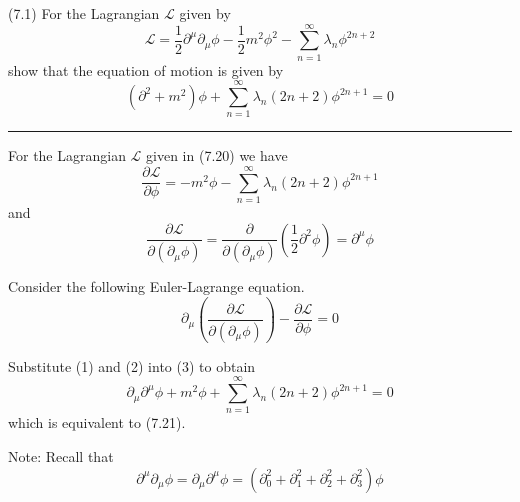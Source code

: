 \documentclass[12pt]{article}
\begin{document}
(7.1)
For the Lagrangian $\mathcal L$ given by
\begin{equation*}
\mathcal L=\frac{1}{2}\partial^\mu\partial_\mu\phi
-\frac{1}{2}m^2\phi^2-\sum_{n=1}^\infty\lambda_n\phi^{2n+2}
\tag{7.20}
\end{equation*}
show that the equation of motion is given by
\begin{equation*}
(\partial^2+m^2)\phi
+\sum_{n=1}^\infty\lambda_n(2n+2)\phi^{2n+1}=0
\tag{7.21}
\end{equation*}

\bigskip
\hrule

\bigskip
For the Lagrangian $\mathcal L$ given in (7.20) we have
\begin{equation*}
\frac{\partial\mathcal L}{\partial\phi}=-m^2\phi-\sum_{n=1}^\infty\lambda_n(2n+2)\phi^{2n+1}
\tag{1}
\end{equation*}
and
\begin{equation*}
\frac{\partial\mathcal L}{\partial(\partial_\mu\phi)}
=\frac{\partial}{\partial(\partial_\mu\phi)}\left(\frac{1}{2}\partial^2\phi\right)
=\partial^\mu\phi
\tag{2}
\end{equation*}

Consider the following Euler-Lagrange equation.
\begin{equation*}
\partial_\mu\left(\frac{\partial\mathcal L}{\partial(\partial_\mu\phi)}\right)-\frac{\partial\mathcal L}{\partial\phi}=0
\tag{3}
\end{equation*}

Substitute (1) and (2) into (3) to obtain
\begin{equation*}
\partial_\mu\partial^\mu\phi+m^2\phi+\sum_{n=1}^\infty\lambda_n(2n+2)\phi^{2n+1}=0
\end{equation*}
which is equivalent to (7.21).

\bigskip
Note: Recall that
\begin{equation*}
\partial^\mu\partial_\mu\phi=\partial_\mu\partial^\mu\phi
=(\partial_0^2+\partial_1^2+\partial_2^2+\partial_3^2)\phi
\end{equation*}
\end{document}
